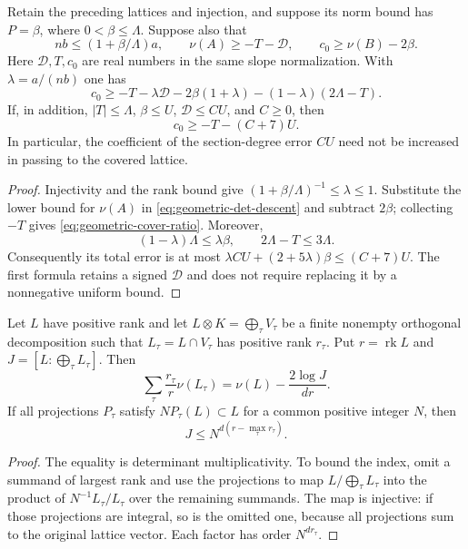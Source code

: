 \begin{corollary}
\label{geometric-cover-improved}
Retain the preceding lattices and injection, and suppose its norm bound
has $P=\beta$, where $0<\beta\le\Lambda$. Suppose also that
\[
 nb\le(1+\beta/\Lambda)a,\qquad
 \nu(A)\ge-T-\mathcal D,\qquad c_0\ge\nu(B)-2\beta.
\]
Here $\mathcal D,T,c_0$ are real numbers in the same slope normalization.
With $\lambda=a/(nb)$ one has
\begin{equation}\label{eq:geometric-cover-ratio}
 c_0\ge-T-\lambda\mathcal D
       -2\beta(1+\lambda)-(1-\lambda)(2\Lambda-T).
\end{equation}
If, in addition, $|T|\le\Lambda$, $\beta\le U$,
$\mathcal D\le CU$, and $C\ge0$, then
\[
                         c_0\ge-T-(C+7)U.
\]
In particular, the coefficient of the section-degree error $CU$ need
not be increased in passing to the covered lattice.
\end{corollary}
\begin{proof}
Injectivity and the rank bound give
$(1+\beta/\Lambda)^{-1}\le\lambda\le1$. Substitute the lower bound for
$\nu(A)$ in \eqref{eq:geometric-det-descent} and subtract $2\beta$;
collecting $-T$ gives \eqref{eq:geometric-cover-ratio}. Moreover,
\[
 (1-\lambda)\Lambda\le\lambda\beta,\qquad
 2\Lambda-T\le3\Lambda.
\]
Consequently its total error is at most
$\lambda CU+(2+5\lambda)\beta\le(C+7)U$.
The first formula retains a signed $\mathcal D$ and does not require
replacing it by a nonnegative uniform bound.
\end{proof}

\begin{proposition}\label{prop:geometric-type-average}
Let $L$ have positive rank and let
$L\otimes K=\bigoplus_\tau V_\tau$ be a finite nonempty orthogonal
decomposition such that $L_\tau=L\cap V_\tau$ has positive rank $r_\tau$.
Put $r=\operatorname{rk}L$ and $J=[L:\bigoplus_\tau L_\tau]$.
Then
\[
 \sum_\tau\frac{r_\tau}{r}\nu(L_\tau)
       =\nu(L)-\frac{2\log J}{dr}.
\]
If all projections $P_\tau$ satisfy $NP_\tau(L)\subset L$ for a
common positive integer $N$, then
\[
 J\le N^{d(r-\max_\tau r_\tau)}.
\]
\end{proposition}
\begin{proof}
The equality is determinant multiplicativity. To bound the index,
omit a summand of largest rank and use the projections to map
$L/\bigoplus_\tau L_\tau$ into the product of
$N^{-1}L_\tau/L_\tau$ over the remaining summands. The map is
injective: if those projections are integral, so is the omitted one,
because all projections sum to the original lattice vector. Each
factor has order $N^{dr_\tau}$.
\end{proof}

